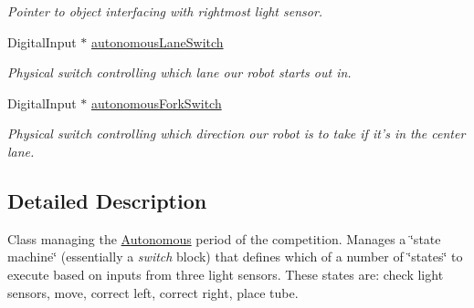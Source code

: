 \begin{DoxyCompactItemize}
\begin{DoxyCompactList}\small\item\em Pointer to object interfacing with rightmost light sensor. \item\end{DoxyCompactList}\item 
\hypertarget{class_r_j_f_r_c2011_1_1_autonomous_afa181f57e25cab35aa5eeffdbc1bd43d}{
DigitalInput $\ast$ \hyperlink{class_r_j_f_r_c2011_1_1_autonomous_afa181f57e25cab35aa5eeffdbc1bd43d}{autonomousLaneSwitch}}
\label{class_r_j_f_r_c2011_1_1_autonomous_afa181f57e25cab35aa5eeffdbc1bd43d}

\begin{DoxyCompactList}\small\item\em Physical switch controlling which lane our robot starts out in. \item\end{DoxyCompactList}\item 
\hypertarget{class_r_j_f_r_c2011_1_1_autonomous_aff3688fd6c4119516863947014e17aca}{
DigitalInput $\ast$ \hyperlink{class_r_j_f_r_c2011_1_1_autonomous_aff3688fd6c4119516863947014e17aca}{autonomousForkSwitch}}
\label{class_r_j_f_r_c2011_1_1_autonomous_aff3688fd6c4119516863947014e17aca}

\begin{DoxyCompactList}\small\item\em Physical switch controlling which direction our robot is to take if it's in the center lane. \item\end{DoxyCompactList}\end{DoxyCompactItemize}


\subsection{Detailed Description}
Class managing the \hyperlink{class_r_j_f_r_c2011_1_1_autonomous}{Autonomous} period of the competition. Manages a \char`\"{}state machine\char`\"{} (essentially a {\itshape switch\/} block) that defines which of a number of \char`\"{}states\char`\"{} to execute based on inputs from three light sensors. These states are: check light sensors, move, correct left, correct right, place tube. 

